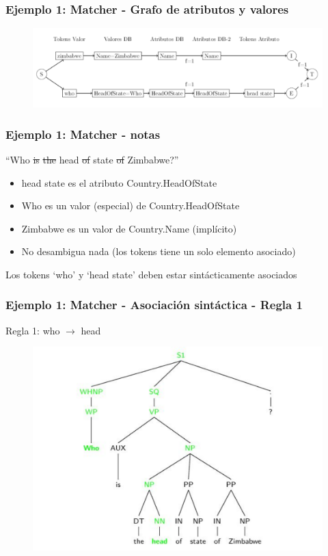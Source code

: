 \begin{frame}
\frametitle{Ejemplo 1: Matcher - Grafo de atributos y valores}
\begin{figure}
  \centering
    \includegraphics[scale=.33]{graficos/presentacion/ejemplo-grafo-matcher-1-6}
\end{figure}
\end{frame}
\begin{frame}[t]
\frametitle{Ejemplo 1: Matcher - notas}
\Large{``{\color{blue}Who} \st{is} \st{the} {\color{blue}head} \st{of} {\color{blue}state} \st{of} {\color{purple}Zimbabwe}?''}
\normalsize{
\begin{itemize}
  \item {\color{blue}head state} es el atributo {\color{blue}Country.HeadOfState}
  \item {\color{blue}Who} es un valor (especial) de {\color{blue}Country.HeadOfState}
  \item {\color{purple}Zimbabwe} es un valor de Country.Name ({\color{purple}implícito})
  \item No desambigua nada (los tokens tiene un solo elemento asociado)
\end{itemize}
}
\bigskip
Los tokens `who' y `head state' deben estar sintácticamente asociados

\end{frame}
\begin{frame}[t]
\frametitle{Ejemplo 1: Matcher - Asociación sintáctica - Regla 1}
\Large{Regla 1: who $\rightarrow$ head}
\begin{center}
\begin{figure}
  \centering
    \includegraphics[scale=.5]{graficos/presentacion/ejemplo-charniak-2}
\end{figure}

\end{center}
\end{frame}

